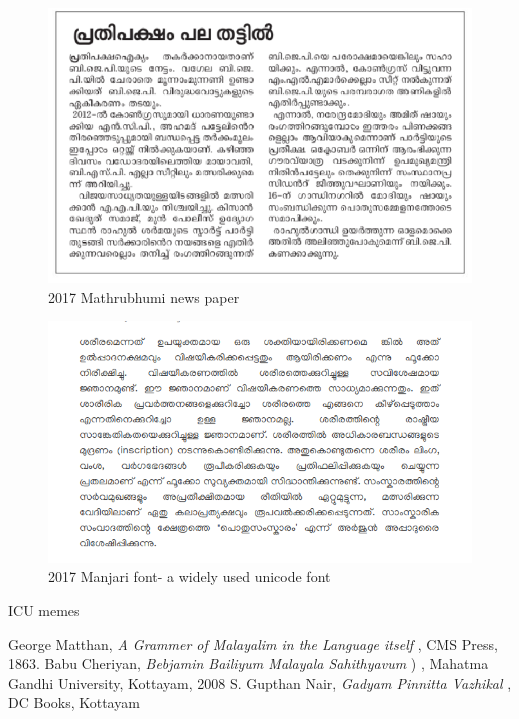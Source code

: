 \documentclass[10pt]{article}
\begin{document}
\begin{figure}
  \centering
   \includegraphics[width=1.0\textwidth]{images/2017-Mathrubhumi-newspaper.png}
     \caption{2017 Mathrubhumi news paper}
\end{figure}


\begin{figure}
  \centering
   \includegraphics[width=1.0\textwidth]{images/Manjari-Body-Text.png}
     \caption{2017 Manjari font- a widely used unicode font}
\end{figure}

ICU memes


\begin{thebibliography}{9}
 George Matthan, \textit{A Grammer of Malayalim in the Language itself },  CMS Press, 1863.
 Babu Cheriyan, \textit{Bebjamin Bailiyum Malayala Sahithyavum} \begingroup {}) \endgroup, Mahatma Gandhi University, Kottayam, 2008
 S. Gupthan Nair, \textit{Gadyam Pinnitta Vazhikal}\begingroup {} \endgroup, DC Books, Kottayam


\end{thebibliography}
\end{document}
